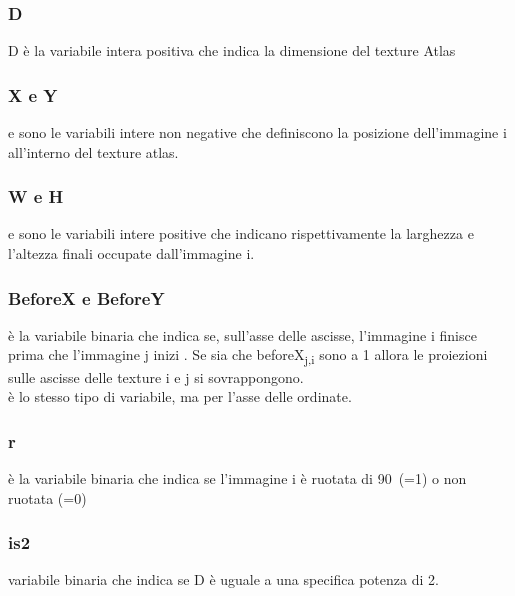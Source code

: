 \subsubsection{D}
D è la variabile intera positiva che indica la dimensione del texture Atlas

\subsubsection{X e Y}
\Xi{} e \Yi{} sono le variabili intere non negative che definiscono la posizione dell'immagine i all'interno del texture atlas.

\subsubsection{W e H}
\Wi{} e \Hi{} sono le variabili intere positive che indicano rispettivamente la larghezza e l'altezza finali occupate dall'immagine i.


\subsubsection{BeforeX e BeforeY}

{\beforeXij} è la variabile binaria che indica se, sull'asse delle ascisse, l'immagine i finisce prima che l'immagine j inizi 
. Se sia \beforeXij{} che beforeX\textsubscript{j,i} sono a 1  allora le proiezioni sulle ascisse delle texture i e j si sovrappongono. \\
{\beforeYij} è lo stesso tipo di variabile, ma per l'asse delle ordinate.

\iffalse
/*
BeforeY
 Questo vincolo esiste sia per l'asse x che per l'asse y e si ripete per ogni coppia ordinata di texture. 
*/
\fi

\subsubsection{r}

{\ri} è la variabile binaria che indica se l'immagine i è ruotata di 90\degree\ (\ri{}=1) o non ruotata (\ri{}=0)

\subsubsection{is2}
\isTp{} variabile binaria che indica se D è uguale a una specifica potenza di 2.







